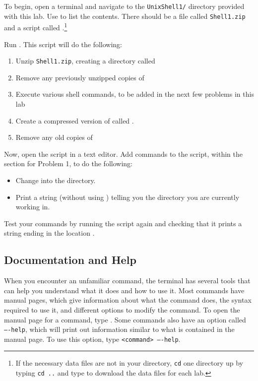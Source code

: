\begin{problem}
To begin, open a terminal and navigate to the \texttt{UnixShell1/} directory provided with this lab.
Use  to list the contents.
There should be a file called \texttt{Shell1.zip} and a script called .\footnote{If the necessary data files are not in your directory, \texttt{cd} one directory up by typing \texttt{cd ..} and type \footnotesize{} to download the data files for each lab.}

Run .
This script will do the following:
\begin{enumerate}
	\item Unzip \texttt{Shell1.zip}, creating a directory called 
	\item Remove any previously unzipped copies of 
	\item Execute various shell commands, to be added in the next few problems in this lab
	\item Create a compressed version of  called .
	\item Remove any old copies of 
\end{enumerate}

Now, open the  script in a text editor.
Add commands to the script, within the section for Problem 1, to do the following:
\begin{itemize}
	\item Change into the  directory.
	\item Print a string (without using ) telling you the directory you are currently working in.
\end{itemize}

Test your commands by running the script again and checking that it prints a string ending in the location .
\label{problem:basic-commands}
\end{problem}

\subsection*{Documentation and Help} %
When you encounter an unfamiliar command, the terminal has several tools that can help you understand what it does and how to use it.
Most commands have manual pages, which give information about what the command does, the syntax required to use it, and different options to modify the command.
To open the manual page for a command, type .
Some commands also have an option called \texttt{----help}, which will print out information similar to what is contained in the manual page.
To use this option, type \texttt{<command> ----help}.

